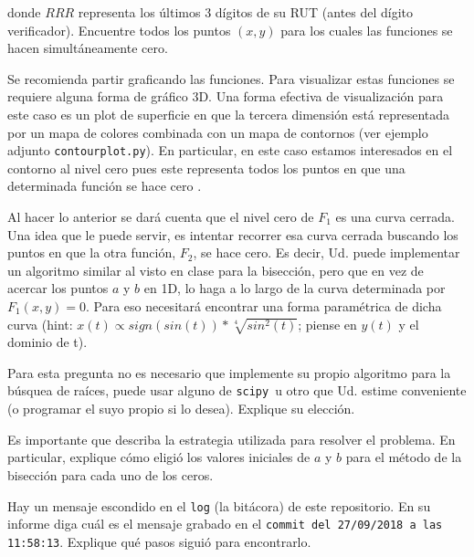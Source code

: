 \documentclass[letter, 11pt]{article}
\newcommand{\scipy}{\texttt{scipy}}
\begin{document}
\noindent donde $RRR$ representa los últimos 3 dígitos de su RUT (antes del
dígito verificador). Encuentre todos los puntos $(x, y)$ para los cuales las
funciones se hacen simultáneamente cero.

\begin{ayuda}
  \small

  Se recomienda partir graficando las funciones. Para visualizar estas
  funciones se requiere alguna forma de gráfico 3D. Una forma efectiva de
  visualización para este caso es un plot de superficie en que la tercera
  dimensión está representada por un mapa de colores combinada con un mapa de
  contornos (ver ejemplo adjunto \texttt{contourplot.py}). En particular, en
  este caso estamos interesados en el contorno al nivel cero pues este
  representa todos los puntos en que una determinada función se hace cero .

  Al hacer lo anterior se dará cuenta que el nivel cero de $F_1$ es una curva
  cerrada. Una idea que le puede servir, es intentar recorrer esa curva cerrada
  buscando los puntos en que la otra función, $F_2$, se hace cero. Es decir,
  Ud.  puede implementar un algoritmo similar al visto en clase para la
  bisección, pero que en vez de acercar los puntos $a$ y $b$ en 1D, lo haga a
  lo largo de la curva determinada por $F_1(x, y)=0$. Para eso necesitará
  encontrar una forma paramétrica de dicha curva (hint: $x(t) \propto
  sign(sin(t)) * \sqrt[4]{sin^2(t)}$; piense en $y(t)$ y el dominio de t).

\end{ayuda}

Para esta pregunta no es necesario que implemente su propio algoritmo para la
búsquea de raíces, puede usar alguno de \scipy~u otro que Ud. estime
conveniente (o programar el suyo propio si lo desea). Explique su elección.

Es importante que describa la estrategia utilizada para resolver el problema.
En particular, explique cómo eligió los valores iniciales de $a$ y $b$ para el
método de la bisección para cada uno de los ceros.

\vspace{1em} 
 Hay un mensaje escondido en el \texttt{log} (la
bitácora) de este repositorio. En su informe diga cuál es el mensaje grabado en
el \texttt{commit del 27/09/2018 a las 11:58:13}. Explique qué pasos siguió
para encontrarlo.
\end{document}
